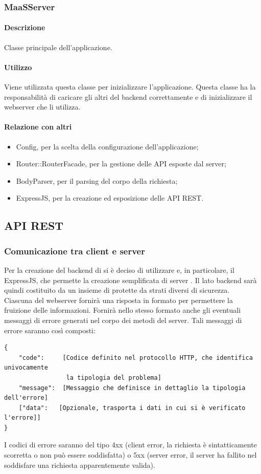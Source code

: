 \subsubsection{MaaSServer}
\paragraph*{Descrizione}
Classe principale dell'applicazione.

\paragraph*{Utilizzo}
Viene utilizzata questa classe per inizializzare l'applicazione. Questa classe ha la responsabilità di caricare gli altri  del backend correttamente e di inizializzare il webserver che li utilizza.
\paragraph*{Relazione con altri }
\begin{itemize}
\item Config, per la scelta della configurazione dell'applicazione;
\item Router::RouterFacade, per la gestione delle API esposte dal server;
\item BodyParser, per il parsing del corpo della richiesta;
\item ExpressJS, per la creazione ed esposizione delle API REST.
\end{itemize}

\subsection{API REST}
\subsubsection{Comunicazione tra client e server}
Per la creazione del backend di  si è deciso di utilizzare  e, in particolare, il  ExpressJS, che permette la creazione semplificata di server . Il lato backend sarà quindi costituito da un insieme di  protette da strati diversi di sicurezza. \\
Ciascuna  del webserver fornirà una risposta in formato  per permettere la fruizione delle informazioni. Fornirà nello stesso formato anche gli eventuali messaggi di errore generati nel corpo dei metodi del server. Tali messaggi di errore saranno così composti: 
\begin{verbatim}
{
    "code":     [Codice definito nel protocollo HTTP, che identifica univocamente
                 la tipologia del problema]
    "message":  [Messaggio che definisce in dettaglio la tipologia dell'errore]
    ["data":   [Opzionale, trasporta i dati in cui si è verificato l'errore]]
}
\end{verbatim}
I codici di errore saranno del tipo 4xx (client error, la richiesta è sintatticamente scorretta o non può essere soddisfatta) o 5xx (server error, il server ha fallito nel soddisfare una richiesta apparentemente valida).
